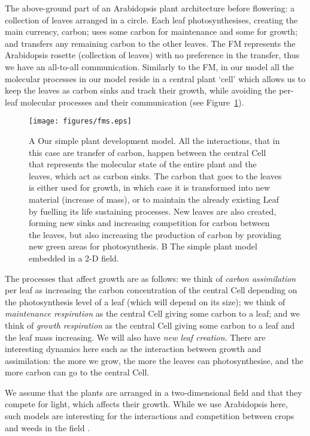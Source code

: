 \documentclass[phd]{infthesis}
\begin{document}
The above-ground part of an Arabidopsis plant
architecture before flowering: a collection of leaves arranged in a circle. Each
leaf photosynthesises, creating the main currency, carbon; uses some carbon for
maintenance and some for growth; and transfers any remaining carbon to the other
leaves. The FM represents the Arabidopsis rosette (collection of leaves) with no
preference in the transfer, thus we have an all-to-all communication. Similarly
to the FM, in our model all the molecular processes in our model reside in a
central plant `cell' which allows us to keep the leaves as carbon sinks and
track their growth, while avoiding the per-leaf molecular processes and their
communication (see Figure~\ref{fig:fm}).

\begin{figure}
\centering
\texttt{[image: figures/fms.eps]}
\caption{ A Our simple plant development model. All the interactions, that in
  this case are transfer of carbon, happen between the central Cell that
  represents the molecular state of the entire plant and the leaves, which act
  as carbon sinks. The carbon that goes to the leaves is either used for growth,
  in which case it is transformed into new material (increase of mass), or to
  maintain the already existing Leaf by fuelling its life sustaining
  processes. New leaves are also created, forming new sinks and increasing
  competition for carbon between the leaves, but also increasing the production
  of carbon by providing new green areas for photosynthesis. B The simple plant
  model embedded in a 2-D field.}
\label{fig:fm}
\end{figure}

The processes that affect growth are as follows: we think of \textit{carbon
assimilation} per leaf as increasing the carbon concentration of the central
Cell depending on the photosynthesis level of a leaf (which will depend on its
size); we think of \textit{maintenance respiration} as the central Cell giving
some carbon to a leaf; and we think of \textit{growth respiration} as the
central Cell giving some carbon to a leaf and the leaf mass increasing. We will
also have \textit{new leaf creation}. There are interesting dynamics here such
as the interaction between growth and assimilation: the more we grow, the more
the leaves can photosynthesise, and the more carbon can go to the central Cell.

We assume that the plants are arranged in a two-dimensional field and that they
compete for light, which affects their growth. While we use Arabidopsis here,
such models are interesting for the interactions and competition between crops
and weeds in the field \citep{rajcan_understanding_2001}.
\end{document}
